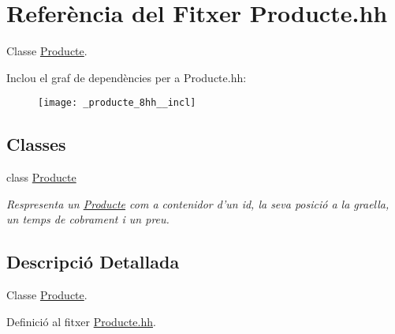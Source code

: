 \hypertarget{_producte_8hh}{\section{Referència del Fitxer Producte.\-hh}
\label{_producte_8hh}
}


Classe \hyperlink{class_producte}{Producte}.  


Inclou el graf de dependències per a Producte.\-hh\-:\nopagebreak
\begin{figure}[H]
\begin{center}
\leavevmode
\texttt{[image: \_producte\_8hh\_\_incl]}
\end{center}
\end{figure}
\subsection*{Classes}
\begin{DoxyCompactItemize}
\item 
class \hyperlink{class_producte}{Producte}
\begin{DoxyCompactList}\small\item\em Respresenta un \hyperlink{class_producte}{Producte} com a contenidor d'un id, la seva posició a la graella, un temps de cobrament i un preu. \end{DoxyCompactList}\end{DoxyCompactItemize}


\subsection{Descripció Detallada}
Classe \hyperlink{class_producte}{Producte}. 

Definició al fitxer \hyperlink{_producte_8hh_source}{Producte.\-hh}.

